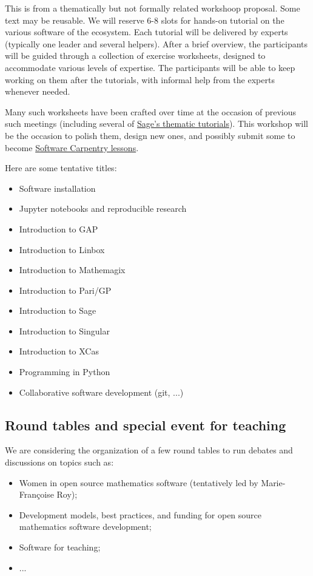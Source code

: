 \begin{oldpart}{This is from a thematically but not formally related workshoop proposal. Some text may be reusable.}
We will reserve 6-8 slots for hands-on tutorial on the various
software of the ecosystem. Each tutorial will be delivered by experts
(typically one leader and several helpers). After a brief overview,
the participants will be guided through a collection of exercise
worksheets, designed to accommodate various levels of expertise.  The
participants will be able to keep working on them after the tutorials,
with informal help from the experts whenever needed.

Many such worksheets have been crafted over time at the occasion of
previous such meetings (including several of
\href{http://doc.sagemath.org/html/en/thematic_tutorials/}{Sage's
  thematic tutorials}). This workshop will be the occasion to polish them,
design new ones, and possibly submit some to become
\href{http://software-carpentry.org/lessons/}{Software Carpentry lessons}.

Here are some tentative titles:
\begin{itemize}
\item Software installation
\item Jupyter notebooks and reproducible research
\item Introduction to GAP
\item Introduction to Linbox
\item Introduction to Mathemagix
\item Introduction to Pari/GP
\item Introduction to Sage
\item Introduction to Singular
\item Introduction to XCas
\item Programming in Python
\item Collaborative software development (git, ...)
\end{itemize}

\subsection{Round tables and special event for teaching}

We are considering the organization of a few round tables to run
debates and discussions on topics such as:

\begin{itemize}
\item Women in open source mathematics software (tentatively led by
  Marie-Françoise Roy);
\item Development models, best practices, and funding for open source
  mathematics software development;
\item Software for teaching;
\item ...
\end{itemize}


\end{oldpart}
